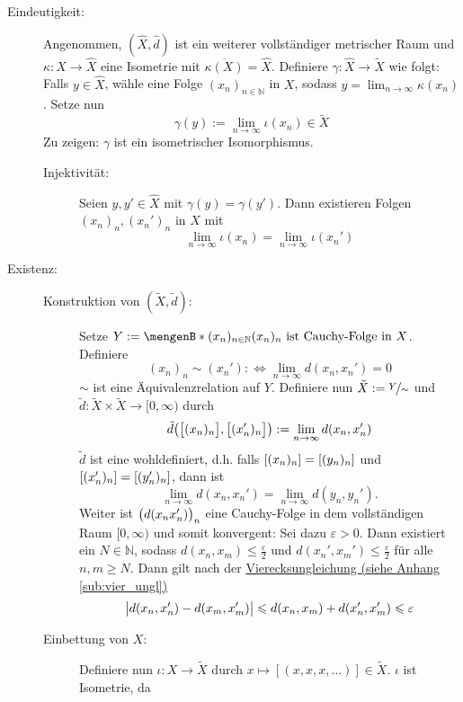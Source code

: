 \begin{description}
	\item[Eindeutigkeit:] 
	Angenommen, $(\hat{X}, \hat{d})$ ist ein weiterer vollständiger metrischer Raum und $\kappa : X \to \hat{X}$ eine Isometrie mit 
	$\overline{\kappa(X)}=\hat{X}$. Definiere $\gamma : \hat{X} \to \tilde{X}$ wie folgt: Falls $y \in \hat{X}$, wähle eine Folge $(x_n)_{n \in \mathds{N}}$ in $X$, sodass
	$y= \lim_{n \to \infty} \kappa(x_n)$. Setze nun
	\[
		\gamma(y) := \lim_{ n \to \infty} \iota(x_n) \in \tilde{X} 
	\]
	Zu zeigen: $\gamma$ ist ein isometrischer Isomorphismus.
	\begin{description}
		\item[Injektivität:] Seien $y,y' \in \hat{X}$ mit $\gamma(y)=\gamma(y')$. Dann existieren Folgen $(x_n)_n, (x_n')_n$ in $X$ mit
		\[
			\lim_{ n \to \infty} \iota(x_n) = \lim_{ n \to \infty} \iota(x_n') 
		\]
	\end{description}
	\item[Existenz:] \begin{description}
		\item[Konstruktion von $(\tilde{X}, \tilde{d})$:] Setze $Y := \set[(x_n)_{n \in \mathds{N}}]{(x_n)_n \text{ ist Cauchy-Folge in }X}$. Definiere 
	\[
		(x_n)_n \sim (x_n') :\iff \lim_{ n \to \infty} d(x_n, x_n') = 0
	\]
	$\sim$ ist eine Äquivalenzrelation auf $Y$. Definiere nun $\tilde{X} := \nicefrac{Y}{\sim}$ und $\tilde{d} :  \tilde{X} \times \tilde{X} \to [0, \infty)$ durch
	\[
		\tilde{d} \enbrace*{\benbrace[\big]{(x_n)_n} , \benbrace[\big]{(x_n')_n}  } := \lim_{ n \to \infty} d(x_n , x_n') 
	\]
	$\tilde{d}$ ist eine wohldefiniert, d.h. falls $\benbrace*{(x_n)_n} = \benbrace*{(y_n)_n} $ und $\benbrace*{(x_n')_n} = \benbrace*{(y_n')_n}$, dann ist
	\[
		\lim_{n \to \infty} d(x_n , x_n') = \lim_{n \to \infty} d(y_n, y_n'). \tag*{(leichte Übung)}
	\]
	Weiter ist $\enbrace[\big]{d(x_n x_n')}_n$ eine Cauchy-Folge in dem vollständigen Raum $[0,\infty)$ und somit 
	konvergent: Sei dazu $\varepsilon>0$. Dann existiert ein $N \in \mathds{N}$, sodass $d(x_n,x_m) \le \frac{\varepsilon}{2}$ und $d(x_n', x_m') \le \frac{\varepsilon}{2}$ für alle $n,m \ge N$. Dann gilt nach der \hyperref[sub:vier_ungl]{Vierecksungleichung (siehe Anhang \ref*{sub:vier_ungl})}
	\[
		\abs[\big]{d(x_n,x_n') - d(x_m,x_m')} \le d(x_n, x_m) + d(x_n', x_m') \le \varepsilon
	\]
	\item[Einbettung von $X:$] Definiere nun $\iota : X \to \tilde{X}$ durch $x \mapsto [(x,x,x, \ldots )] \in \tilde{X}$. $\iota$ ist Isometrie, da

\end{description}
\end{description}
